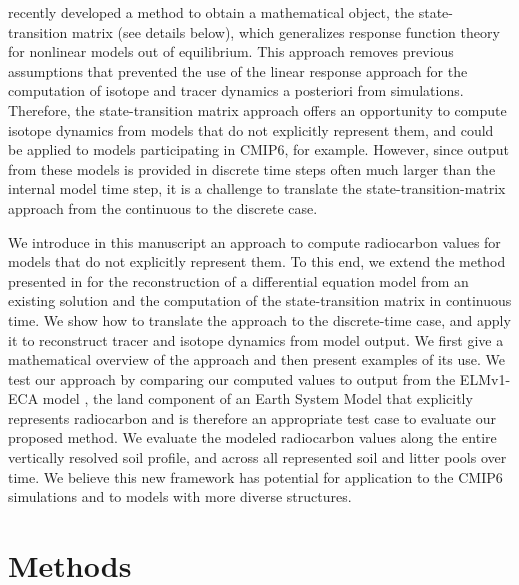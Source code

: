 \documentclass[11pt,a4paper]{article}
\begin{document}
\citet{Metzler2018PNAS} recently developed a method to obtain a mathematical object, the state-transition matrix (see details below), which generalizes response function theory for nonlinear models out of equilibrium. This approach removes previous assumptions that prevented the use of the linear response approach for the computation of isotope and tracer dynamics a posteriori from simulations. Therefore, the state-transition matrix approach offers an opportunity to compute isotope dynamics from models that do not explicitly represent them, and could be applied to models participating in CMIP6, for example. However, since output from these models is provided in discrete time steps often much larger than the internal model time step, it is a challenge to translate the state-transition-matrix approach from the continuous to the discrete case.

We introduce in this manuscript an approach to compute radiocarbon values for models that do not explicitly represent them. To this end, we extend the method presented in \citet{Metzler2018PNAS} for the reconstruction of a differential equation model from an existing solution and the computation of the state-transition matrix in continuous time. We show how to translate the approach to the discrete-time case, and apply it to reconstruct tracer and isotope dynamics from model output. We first give a mathematical overview of the approach and then present examples of its use. We test our approach by comparing our computed values to output from the ELMv1-ECA model \citep{Zhu2019, Riley2018,Chen2009JGR, Tang2018EI}, the land component of an Earth System Model that explicitly represents radiocarbon and is therefore an appropriate test case to evaluate our proposed method. We evaluate the modeled radiocarbon values along the entire vertically resolved soil profile, and across all represented soil and litter pools over time. We believe this new framework has  potential for application to the CMIP6 simulations and to models with more diverse structures.

\section{Methods}
\end{document}
